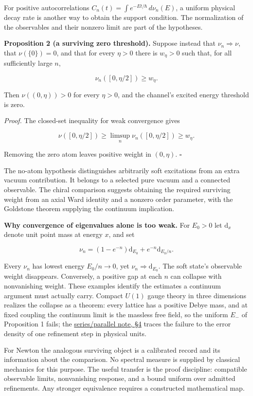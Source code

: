 \documentclass[11pt,a4paper]{article}
\begin{document}
For positive autocorrelations \(C_n(t)=\int e^{-Et/\hbar}\,d\nu_n(E)\),
a uniform physical decay rate is another way to obtain the support
condition. The normalization of the observables and their nonzero limit
are part of the hypotheses.

\textbf{Proposition 2 (a surviving zero threshold).} Suppose instead
that \(\nu_n\Rightarrow\nu\), that \(\nu(\{0\})=0\), and that for every
\(\eta>0\) there is \(w_\eta>0\) such that, for all sufficiently large
\(n\),

\[\nu_n([0,\eta/2])\ge w_\eta.\]

Then \(\nu((0,\eta))>0\) for every \(\eta>0\), and the channel's excited
energy threshold is zero.

\emph{Proof.} The closed-set inequality for weak convergence gives

\[\nu([0,\eta/2])\ge\limsup_n\nu_n([0,\eta/2])\ge w_\eta.\]

Removing the zero atom leaves positive weight in \((0,\eta)\).
\(\square\)

The no-atom hypothesis distinguishes arbitrarily soft excitations from
an extra vacuum contribution. It belongs to a selected pure vacuum and a
connected observable. The chiral comparison suggests obtaining the
required surviving weight from an axial Ward identity and a nonzero
order parameter, with the Goldstone theorem supplying the continuum
implication.

\textbf{Why convergence of eigenvalues alone is too weak.} For \(E_0>0\)
let \(\mathrm d_x\) denote unit point mass at energy \(x\), and set

\[\nu_n=(1-e^{-n})\mathrm d_{E_0}+e^{-n}\mathrm d_{E_0/n}.\]

Every \(\nu_n\) has lowest energy \(E_0/n\to0\), yet
\(\nu_n\Rightarrow\mathrm d_{E_0}\). The soft state's observable weight
disappears. Conversely, a positive gap at each \(n\) can collapse with
nonvanishing weight. These examples identify the estimates a continuum
argument must actually carry. Compact \(U(1)\) gauge theory in three
dimensions realizes the collapse as a theorem: every lattice has a
positive Debye mass, and at fixed coupling the continuum limit is the
massless free field, so the uniform \(E_-\) of Proposition 1 fails; the
\href{series-parallel-gauge-refinement.md}{series/parallel note, §4}
traces the failure to the error density of one refinement step in
physical units.

For Newton the analogous surviving object is a calibrated record and its
information about the comparison. No spectral measure is supplied by
classical mechanics for this purpose. The useful transfer is the proof
discipline: compatible observable limits, nonvanishing response, and a
bound uniform over admitted refinements. Any stronger equivalence
requires a constructed mathematical map.
\end{document}
